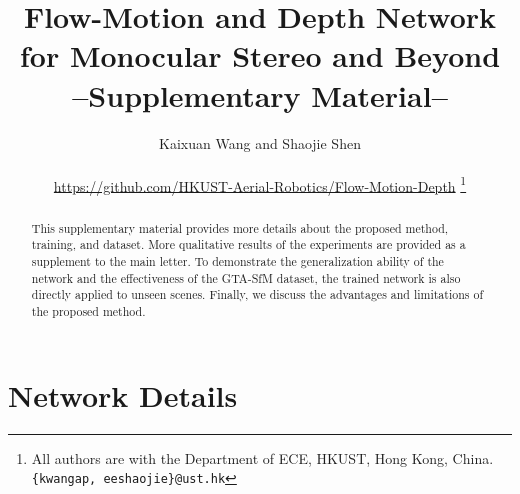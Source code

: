 \documentclass[letterpaper, 10 pt, conference]{ieeeconf}  %
\title{\LARGE \bf
Flow-Motion and Depth Network for Monocular Stereo and Beyond
\\ --Supplementary Material--
}
\author{Kaixuan Wang and Shaojie Shen
\\
\\ \url{https://github.com/HKUST-Aerial-Robotics/Flow-Motion-Depth}%
\thanks{All authors are with the Department of ECE, HKUST, Hong Kong, China. {\tt\small \{kwangap, eeshaojie\}@ust.hk}}
}
\begin{document}
 
 
 
 
 
\maketitle
 
\begin{abstract}
   
This supplementary material provides more details about the proposed method, training, and dataset. More qualitative results of the experiments are provided as a supplement to the main letter. To demonstrate the generalization ability of the network and the effectiveness of the GTA-SfM dataset, the trained network is also directly applied to unseen scenes. Finally, we discuss the advantages and limitations of the proposed method.
\end{abstract}
 
\section{Network Details}
 
\end{document}
